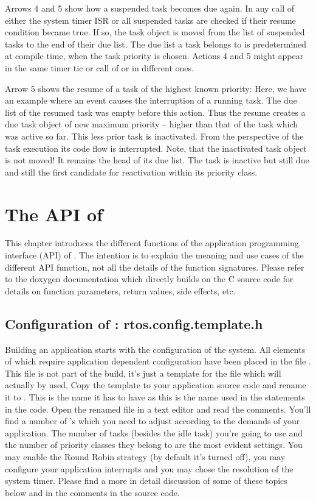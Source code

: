Arrows 4 and 5 show how a suspended task becomes due again. In any call of
either the system timer ISR or  all suspended tasks are
checked if their resume condition became true. If so, the task object is
moved from the list of suspended tasks to the end of their due list. The
due list a task belongs to is predetermined at compile time, when the task
priority is chosen. Actions 4 and 5 might appear in the same timer tic or
call of  or in different ones.

Arrow 5 shows the resume of a task of the highest known priority: Here, we
have an example where an event causes the interruption of a running task.
The due list of the resumed task was empty before this action. Thus the
resume creates a due task object of new maximum priority -- higher than
that of the task which was active so far. This less prior task is
inactivated. From the perspective of the task execution its code flow is
interrupted. Note, that the inactivated task object is not moved! It
remains the head of its due list. The task is inactive but still due and
still the first candidate for reactivation within its priority class.



\chapter{The API of \rtos}
\label{secAPI}

This chapter introduces the different functions of the application
programming interface (API) of \rtos. The intention is to explain the
meaning and use cases of the different API function, not all the details
of the function signatures. Please refer to the doxygen documentation
which directly builds on the C source code for details on function
parameters, return values, side effects, etc.


\section{Configuration of \rtos: rtos.config.template.h}

Building an \rtos{} application starts with the configuration of the
system. All elements of \rtos{} which require application dependent
configuration have been placed in the file .
This file is not part of the build, it's just a template for the file which
will actually by used. Copy the template to your application source code
and rename it to . This is the name it has to have as
this is the name used in the  statements in the code.
Open the renamed file in a text editor and read the comments. You'll find
a number of 's which you need to adjust according to the
demands of your application. The number of tasks (besides the idle task)
you're going to use and the number of priority classes they belong to are
the most evident settings. You may enable the Round Robin strategy (by
default it's turned off), you may configure your application interrupts
and you may chose the resolution of the system timer. Please find a more
in detail discussion of some of these topics below and in the comments in
the source code.

